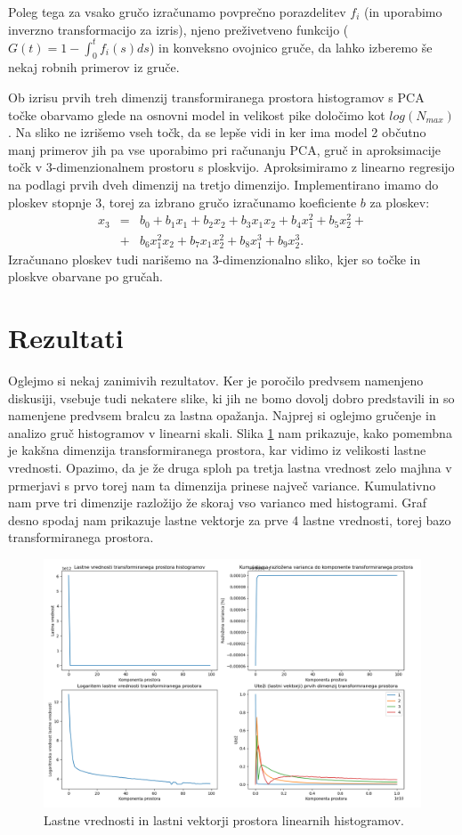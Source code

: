 \documentclass[a4paper]{IEEEtran}
\begin{document}
Poleg tega za vsako gručo izračunamo povprečno porazdelitev $f_i$ (in uporabimo inverzno transformacijo za izris), njeno preživetveno funkcijo ($G(t) = 1 - \int_0^t f_i(s) ds$) in konveksno ovojnico gruče, da lahko izberemo še nekaj robnih primerov iz gruče.

Ob izrisu prvih treh dimenzij transformiranega prostora histogramov s PCA točke obarvamo glede na osnovni model in velikost pike določimo kot $log(N_{max})$. Na sliko ne izrišemo vseh točk, da se lepše vidi in ker ima model 2 občutno manj primerov jih pa vse uporabimo pri računanju PCA, gruč in aproksimacije točk v 3-dimenzionalnem prostoru s ploskvijo. Aproksimiramo z linearno regresijo na podlagi prvih dveh dimenzij na tretjo dimenzijo. Implementirano imamo do ploskev stopnje 3, torej za izbrano gručo izračunamo koeficiente $b$ za ploskev: \begin{eqnarray}
x_3 &=& b_0 + b_1 x_1 + b_2 x_2 + b_3 x_1 x_2 + b_4 x_1^2 + b_5 x_2^2 + \nonumber \\
&+& b_6 x_1^2 x_2 + b_7 x_1 x_2^2 + b_8 x_1^3 + b_9 x_2^3. \nonumber
\end{eqnarray}
Izračunano ploskev tudi narišemo na 3-dimenzionalno sliko, kjer so točke in ploskve obarvane po gručah.

\section{Rezultati}

Oglejmo si nekaj zanimivih rezultatov. Ker je poročilo predvsem namenjeno diskusiji, vsebuje tudi nekatere slike, ki jih ne bomo dovolj dobro predstavili in so namenjene predvsem bralcu za lastna opažanja. Najprej si oglejmo gručenje in analizo gruč histogramov v linearni skali. Slika \ref{fig:lineig} nam prikazuje, kako pomembna je kakšna dimenzija transformiranega prostora, kar vidimo iz velikosti lastne vrednosti. Opazimo, da je že druga sploh pa tretja lastna vrednost zelo majhna v prmerjavi s prvo torej nam ta dimenzija prinese največ variance. Kumulativno nam prve tri dimenzije razložijo že skoraj vso varianco med histogrami. Graf desno spodaj nam prikazuje lastne vektorje za prve 4 lastne vrednosti, torej bazo transformiranega prostora.

\begin{figure}
	\centering
	\includegraphics[width=0.9\linewidth]{Figures/lin_eigendecomp}
	\caption{Lastne vrednosti in lastni vektorji prostora linearnih histogramov.}
	\label{fig:lineig}
\end{figure}
\end{document}
